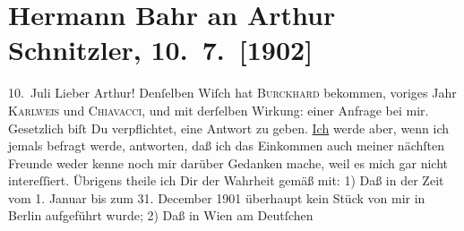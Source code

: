 

         
         \renewcommand{\erwaehntePersonen}{Personen: Max Eugen Burckhard, Vincenz Chiavacci, Carl Karlweis}
         \renewcommand{\erwaehnteOrte}{Orte: Berlin, Burgtheater, Volkstheater, Wien}
         \renewcommand{\erwaehnteWerke}{Werke: Der Apostel. Schauspiel in drei Aufzügen, Wienerinnen. Lustspiel in drei Akten}
               \section[Hermann Bahr an Arthur Schnitzler, 10. 7. {[}1902{]}]{ Hermann Bahr an Arthur Schnitzler, 10. 7. {[}1902{]}}\nopagebreak{}\rehead{ }\begin{ledgroupsized}[t]{13cm}\normalsize\beginnumbering \toendnotes[C]{\smallbreak\pagebreak[2]} 
\pstart
           \raggedleft{}{\pb}10. Juli\pend
           \pstart\center{}Lieber Arthur!\pend\pstart
           Denſelben Wiſch hat \textsc{Burckhard} bekommen, voriges Jahr \textsc{Karlweis} und \textsc{Chiavacci}, und mit derſelben Wirkung: einer Anfrage bei mir. Gesetzlich biſt Du
               verpflichtet, eine Antwort zu geben. \uline{Ich} werde aber,
               wenn ich jemals befragt werde, antworten, daß ich das Einkommen {\pb}auch meiner nächſten Freunde weder kenne noch mir
               darüber Gedanken mache, weil es mich gar nicht intereſſiert.\pend
           \pstart
           Übrigens theile ich Dir der Wahrheit gemäß mit: 1) Daß in der Zeit vom 1. Januar bis
               zum 31. December 1901 überhaupt kein Stück von mir in Berlin aufgeführt wurde; {\pb}2) Daß in Wien am Deutſchen

\end{ledgroupsized}
